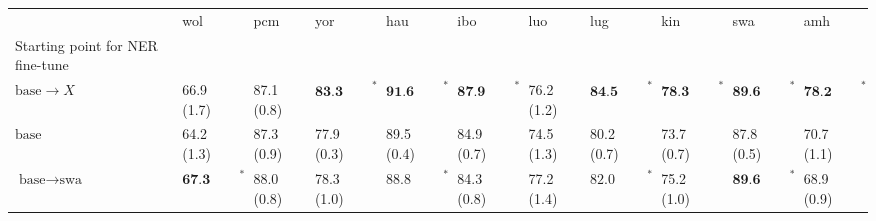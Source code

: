 \begin{tabular}{lllllllllll}
\toprule
{} &                      wol &         pcm &                      yor &                      hau &                      ibo &         luo &                      lug &                      kin &                      swa &                      amh \\
Starting point for NER fine-tune &                          &             &                          &                          &                          &             &                          &                          &                          &                          \\
\midrule
$\text{base} \to X$              &               66.9 (1.7) &  87.1 (0.8) &  $\textbf{83.3 (0.3)}^*$ &  $\textbf{91.6 (0.4)}^*$ &  $\textbf{87.9 (0.5)}^*$ &  76.2 (1.2) &  $\textbf{84.5 (0.5)}^*$ &  $\textbf{78.3 (1.0)}^*$ &  $\textbf{89.6 (0.6)}^*$ &  $\textbf{78.2 (0.8)}^*$ \\
$\text{base}$                    &               64.2 (1.3) &  87.3 (0.9) &               77.9 (0.3) &               89.5 (0.4) &               84.9 (0.7) &  74.5 (1.3) &               80.2 (0.7) &               73.7 (0.7) &               87.8 (0.5) &               70.7 (1.1) \\
$\text{base} \to \text{swa}$     &  $\textbf{67.3 (1.3)}^*$ &  88.0 (0.8) &               78.3 (1.0) &    $\text{88.8 (0.2)}^*$ &               84.3 (0.8) &  77.2 (1.4) &    $\text{82.0 (0.5)}^*$ &               75.2 (1.0) &  $\textbf{89.6 (0.6)}^*$ &               68.9 (0.9) \\
\bottomrule
\end{tabular}
